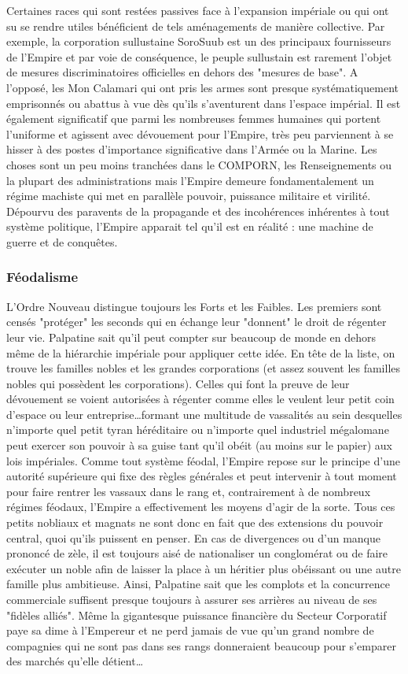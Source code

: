 \documentclass[twoside]{article}
\begin{document}
Certaines races qui sont restées passives face à l'expansion impériale ou qui ont su se rendre utiles bénéficient de tels aménagements de manière collective. Par exemple, la corporation sullustaine SoroSuub est un des principaux fournisseurs de l'Empire et par voie de conséquence, le peuple sullustain est rarement l'objet de mesures discriminatoires officielles en dehors des "mesures de base". A l'opposé, les Mon Calamari qui ont pris les armes sont presque systématiquement emprisonnés ou abattus à vue dès qu'ils s'aventurent dans l'espace impérial.
Il est également significatif que parmi les nombreuses femmes humaines qui portent l'uniforme et agissent avec dévouement pour l'Empire, très peu parviennent à se hisser à des postes d'importance significative dans l'Armée ou la Marine. Les choses sont un peu moins tranchées dans le COMPORN, les Renseignements ou la plupart des administrations mais l'Empire demeure fondamentalement un régime machiste qui met en parallèle pouvoir, puissance militaire et virilité. Dépourvu des paravents de la propagande et des incohérences inhérentes à tout système politique, l'Empire apparait tel qu'il est en réalité : une machine de guerre et de conquêtes.

\subsubsection{Féodalisme}
L'Ordre Nouveau distingue toujours les Forts et les Faibles. Les premiers sont censés "protéger" les seconds qui en échange leur "donnent" le droit de régenter leur vie. Palpatine sait qu'il peut compter sur beaucoup de monde en dehors même de la hiérarchie impériale pour appliquer cette idée. En tête de la liste, on trouve les familles nobles et les grandes corporations (et assez souvent les familles nobles qui possèdent les corporations). Celles qui font la preuve de leur dévouement se voient autorisées à régenter comme elles le veulent leur petit coin d'espace ou leur entreprise\ldots formant une multitude de vassalités au sein desquelles n'importe quel petit tyran héréditaire ou n'importe quel industriel mégalomane peut exercer son pouvoir à sa guise tant qu'il obéit (au moins sur le papier) aux lois impériales. Comme tout système féodal, l'Empire repose sur le principe d'une autorité supérieure qui fixe des règles générales et peut intervenir à tout moment pour faire rentrer les vassaux dans le rang et, contrairement à de nombreux régimes féodaux, l'Empire a effectivement les moyens d'agir de la sorte. Tous ces petits nobliaux et magnats ne sont donc en fait que des extensions du pouvoir central, quoi qu'ils puissent en penser. En cas de divergences ou d'un manque prononcé de zèle, il est toujours aisé de nationaliser un conglomérat ou de faire exécuter un noble afin de laisser la place à un héritier plus obéissant ou une autre famille plus ambitieuse. Ainsi, Palpatine sait que les complots et la concurrence commerciale suffisent presque toujours à assurer ses arrières au niveau de ses "fidèles alliés". Même la gigantesque puissance financière du Secteur Corporatif paye sa dime à l'Empereur et ne perd jamais de vue qu'un grand nombre de compagnies qui ne sont pas dans ses rangs donneraient beaucoup pour s'emparer des marchés qu'elle détient\ldots
\end{document}
